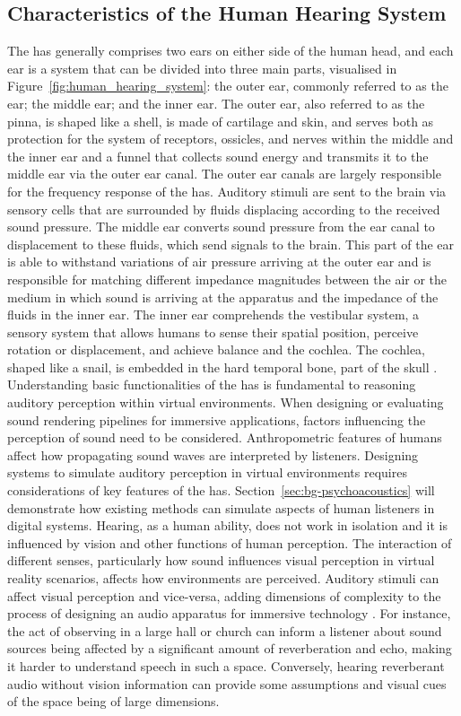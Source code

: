 \subsection{Characteristics of the Human Hearing System}
The \acrfull{has} generally comprises two ears on either side of the human head, and each ear is a system that can be divided into three main parts, visualised in Figure~\ref{fig:human_hearing_system}: the outer ear, commonly referred to as the ear; the middle ear; and the inner ear. The outer ear, also referred to as the pinna, is shaped like a shell, is made of cartilage and skin, and serves both as protection for the system of receptors, ossicles, and nerves within the middle and the inner ear and a funnel that collects sound energy and transmits it to the middle ear via the outer ear canal. The outer ear canals are largely responsible for the frequency response of the \acrshort{has}. 
Auditory stimuli are sent to the brain via sensory cells that are surrounded by fluids displacing according to the received sound pressure. The middle ear converts sound pressure from the ear canal to displacement to these fluids, which send signals to the brain. This part of the ear is able to withstand variations of air pressure arriving at the outer ear and is responsible for matching different impedance magnitudes between the air or the medium in which sound is arriving at the apparatus and the impedance of the fluids in the inner ear.
The inner ear comprehends the vestibular system, a sensory system that allows humans to sense their spatial position, perceive rotation or displacement, and achieve balance and the cochlea. The cochlea, shaped like a snail, is embedded in the hard temporal bone, part of the skull \citep{zwicker2013psychoacoustics}.
Understanding basic functionalities of the \acrshort{has} is fundamental to reasoning auditory perception within virtual environments. When designing or evaluating sound rendering pipelines for immersive applications, factors influencing the perception of sound need to be considered.
Anthropometric features of humans affect how propagating sound waves are interpreted by listeners. Designing systems to simulate auditory perception in virtual environments requires considerations of key features of the \acrshort{has}. Section~\ref{sec:bg-psychoacoustics} will demonstrate how existing methods can simulate aspects of human listeners in digital systems.
Hearing, as a human ability, does not work in isolation and it is influenced by vision and other functions of human perception. The interaction of different senses, particularly how sound influences visual perception in virtual reality scenarios, affects how environments are perceived. Auditory stimuli can affect visual perception and vice-versa, adding dimensions of complexity to the process of designing an audio apparatus for immersive technology \citep{malpica2020crossmodal}. For instance, the act of observing in a large hall or church can inform a listener about sound sources being affected by a significant amount of reverberation and echo, making it harder to understand speech in such a space. Conversely, hearing reverberant audio without vision information can provide some assumptions and visual cues of the space being of large dimensions.
